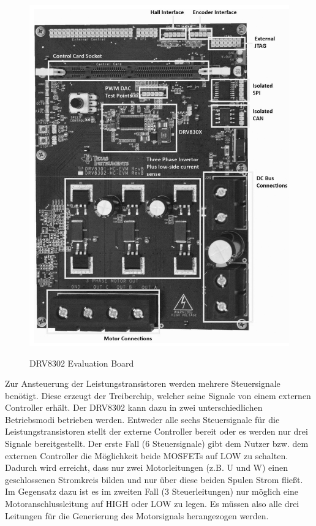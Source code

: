 \begin{figure}[htbp]
	\centering
	\includegraphics[width=\textwidth]{hardware/graphics/TI_Eval_Board}
	\caption{DRV8302 Evaluation Board}
	\quelle \cite{Instruments2014}
	\label{fig:DRV8302Board}
\end{figure}

Zur Ansteuerung der Leistungstransistoren werden mehrere Steuersignale benötigt.
Diese erzeugt der Treiberchip, welcher seine Signale von einem externen Controller erhält.
Der DRV8302 kann dazu in zwei unterschiedlichen Betriebsmodi betrieben werden.
Entweder alle sechs Steuersignale für die Leistungstransistoren stellt der externe Controller bereit oder es werden nur drei Signale bereitgestellt.
Der erste Fall (6 Steuersignale) gibt dem Nutzer bzw. dem externen Controller die Möglichkeit beide MOSFETs auf LOW zu schalten.
Dadurch wird erreicht, dass nur zwei Motorleitungen (z.B. U und W) einen geschlossenen Stromkreis bilden und nur über diese beiden Spulen Strom fließt.
Im Gegensatz dazu ist es im zweiten Fall (3 Steuerleitungen) nur möglich eine Motoranschlussleitung auf HIGH oder LOW zu legen. 
Es müssen also alle drei Leitungen für die Generierung des Motorsignals herangezogen werden.

